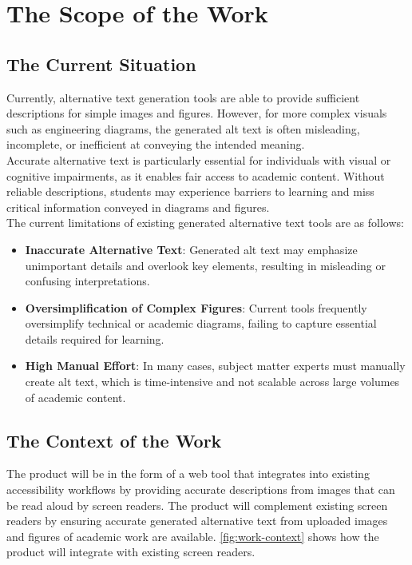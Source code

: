 \documentclass[12pt]{article}
\begin{document}
\section{The Scope of the Work}
\subsection{The Current Situation}
Currently, alternative text generation tools are able to provide
sufficient descriptions for simple images and figures. However, for
more complex visuals
such as engineering diagrams, the generated alt text is often
misleading, incomplete, or inefficient at conveying the intended meaning.\\
Accurate alternative text is particularly essential for individuals
with visual or cognitive impairments, as it enables fair access to
academic content. Without
reliable descriptions, students may experience barriers to learning
and miss critical information conveyed in diagrams and figures.\\
The current limitations of existing generated alternative text tools
are as follows:
\begin{itemize}
  \item \textbf{Inaccurate Alternative Text}: Generated alt text may
    emphasize unimportant details and overlook key elements,
    resulting in misleading or confusing interpretations.
  \item \textbf{Oversimplification of Complex Figures}: Current tools
    frequently oversimplify technical or academic diagrams,
    failing to capture essential details required for learning.
  \item \textbf{High Manual Effort}: In many cases, subject matter
    experts must manually create alt text,
    which is time-intensive and not scalable across large volumes of
    academic content.
\end{itemize}

\subsection{The Context of the Work}
The product will be in the form of a web tool that integrates into
existing accessibility workflows
by providing accurate descriptions from images that can be read aloud
by screen readers. The product
will complement existing screen readers by ensuring accurate
generated alternative text from
uploaded images and figures of academic work are available.
\autoref{fig:work-context} shows
how the product will integrate with existing screen readers.
\end{document}
